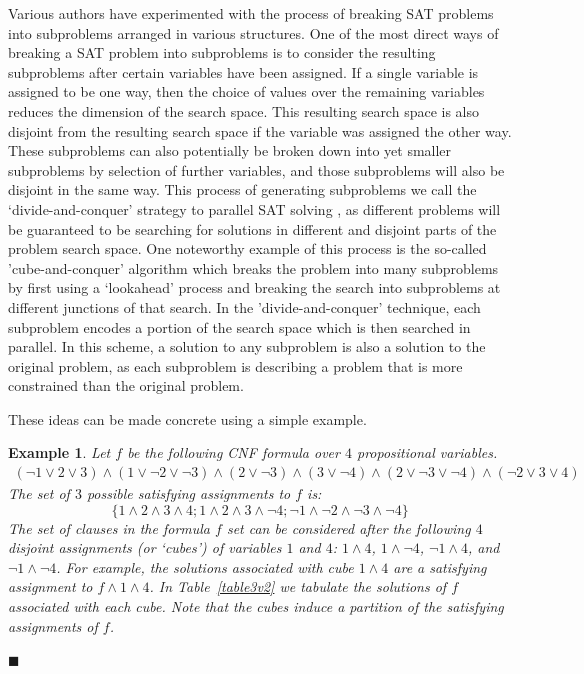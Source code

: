 \documentclass[
10pt, %
a4paper, %
oneside, %
headinclude,footinclude, %
BCOR5mm, %
]{scrartcl}
\begin{document}
Various authors have experimented with the process of breaking SAT problems into subproblems arranged in various structures.
One of the most direct ways of breaking a SAT problem into subproblems is to consider the resulting subproblems after certain variables have been assigned.
If a single variable is assigned to be one way, then the choice of values over the remaining variables reduces the dimension of the search space.
This resulting search space is also disjoint from the resulting search space if the variable was assigned the other way.
These subproblems can also potentially be broken down into yet smaller subproblems by selection of further variables, and those subproblems will also be disjoint in the same way.
This process of generating subproblems we call the `divide-and-conquer' strategy to parallel SAT solving \cite{DBLP:journals/aim/HamadiW13}, as different problems will be
guaranteed to be searching for solutions in different and disjoint parts of the problem search space.
One noteworthy example of this process is the so-called 'cube-and-conquer' algorithm \cite{cube_and_conquer1} which breaks the problem into 
many subproblems by first using a `lookahead' process \cite{lookahead_sat_solvers1} and breaking the search into subproblems at different junctions of that search.
In the 'divide-and-conquer' technique, each subproblem encodes a portion of the search space which is then searched in parallel. In this scheme,
a solution to any subproblem is also a solution to the original problem, as each subproblem is describing a problem that is more constrained than the original problem.

These ideas can be made concrete using a simple example.

\newtheorem{myeg}{Example}
\begin{myeg} \label{eg:cubes}
  Let $f$ be the following CNF formula over $4$ propositional variables. 
  \[
  \begin{array}{c}
    ( \neg 1 \lor 2 \lor 3) \land  (1 \lor \neg 2 \lor \neg 3 ) \land ( 2 \lor \neg 3 ) \land ( 3 \lor \neg 4 ) \land (2 \lor \neg 3 \lor \neg 4 ) \land ( \neg 2 \lor 3 \lor 4 )
  \end{array}
  \]
  The set of $3$ possible satisfying assignments to $f$ is:
  \[
  \{1 \land 2 \land 3 \land 4 ;
  1 \land 2 \land 3 \land \neg 4 ;
  \neg 1 \land \neg 2 \land \neg 3 \land \neg 4 \}\]
  The set of clauses in the formula $f$ set can be considered after the following $4$ disjoint assignments (or `cubes') of variables $1$ and $4$: $1\land 4$, $1\land \neg 4$,  $\neg 1\land 4$,  and $\neg 1\land \neg 4$.
  For example, the solutions associated with cube $1\land 4$ are a satisfying assignment to $f \land 1 \land 4$.
  In Table~\ref{table3v2} we tabulate the solutions of $f$ associated with each cube.
  Note that the cubes induce a partition of the satisfying assignments of $f$.
  \begin{flushright}$\blacksquare$\end{flushright}
\end{myeg}
\end{document}
